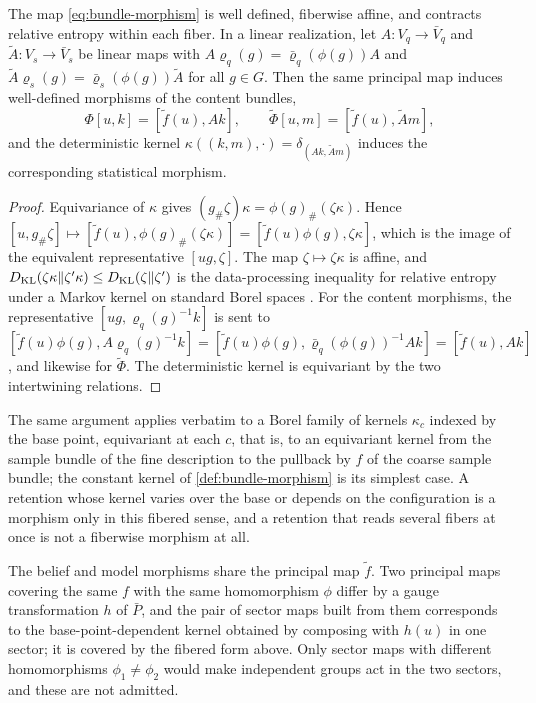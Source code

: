The map \cref{eq:bundle-morphism} is well defined, fiberwise affine, and contracts relative entropy within each fiber. In a linear realization, let $A:V_q\to\bar V_q$ and $\tilde A:V_s\to\bar V_s$ be linear maps with $A\varrho_q(g)=\bar\varrho_q(\phi(g))A$ and $\tilde A\varrho_s(g)=\bar\varrho_s(\phi(g))\tilde A$ for all $g\in G$. Then the same principal map induces well-defined morphisms of the content bundles,
\begin{equation}
\Phi[u,k]=[\tilde f(u),Ak],\qquad
\tilde\Phi[u,m]=[\tilde f(u),\tilde Am],
\label{eq:content-morphisms}
\end{equation}
and the deterministic kernel $\kappa((k,m),\cdot)=\delta_{(Ak,\tilde Am)}$ induces the corresponding statistical morphism.
\begin{proof}
Equivariance of $\kappa$ gives $(g_\#\zeta)\kappa=\phi(g)_\#(\zeta\kappa)$. Hence $[u,g_\#\zeta]\mapsto[\tilde f(u),\phi(g)_\#(\zeta\kappa)]=[\tilde f(u)\phi(g),\zeta\kappa]$, which is the image of the equivalent representative $[ug,\zeta]$. The map $\zeta\mapsto\zeta\kappa$ is affine, and $D_{\mathrm{KL}}(\zeta\kappa\Vert\zeta'\kappa)\leq D_{\mathrm{KL}}(\zeta\Vert\zeta')$ is the data-processing inequality for relative entropy under a Markov kernel on standard Borel spaces \citep[Chapter~5]{Gray1990}. For the content morphisms, the representative $[ug,\varrho_q(g)^{-1}k]$ is sent to $[\tilde f(u)\phi(g),A\varrho_q(g)^{-1}k]=[\tilde f(u)\phi(g),\bar\varrho_q(\phi(g))^{-1}Ak]=[\tilde f(u),Ak]$, and likewise for $\tilde\Phi$. The deterministic kernel is equivariant by the two intertwining relations.
\end{proof}

The same argument applies verbatim to a Borel family of kernels $\kappa_c$ indexed by the base point, equivariant at each $c$, that is, to an equivariant kernel from the sample bundle of the fine description to the pullback by $f$ of the coarse sample bundle; the constant kernel of \cref{def:bundle-morphism} is its simplest case. A retention whose kernel varies over the base or depends on the configuration is a morphism only in this fibered sense, and a retention that reads several fibers at once is not a fiberwise morphism at all.

The belief and model morphisms share the principal map $\tilde f$. Two principal maps covering the same $f$ with the same homomorphism $\phi$ differ by a gauge transformation $h$ of $\bar P$, and the pair of sector maps built from them corresponds to the base-point-dependent kernel obtained by composing with $h(u)$ in one sector; it is covered by the fibered form above. Only sector maps with different homomorphisms $\phi_1\neq\phi_2$ would make independent groups act in the two sectors, and these are not admitted.

